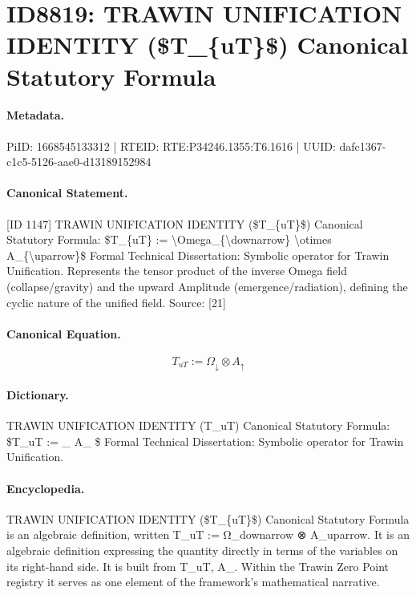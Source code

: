 \section*{ID8819: TRAWIN UNIFICATION IDENTITY (\$T\_\{uT\}\$) Canonical Statutory Formula}
\paragraph{Metadata.}
PiID: 1668545133312 | RTEID: RTE:P34246.1355:T6.1616 | UUID: dafc1367-c1c5-5126-aae0-d13189152984

\paragraph{Canonical Statement.}
[ID 1147] TRAWIN UNIFICATION IDENTITY (\$T\_\{uT\}\$) Canonical Statutory Formula: \$T\_\{uT\} := \textbackslash{}Omega\_\{\textbackslash{}downarrow\} \textbackslash{}otimes A\_\{\textbackslash{}uparrow\}\$ Formal Technical Dissertation: Symbolic operator for Trawin Unification. Represents the tensor product of the inverse Omega field (collapse/gravity) and the upward Amplitude (emergence/radiation), defining the cyclic nature of the unified field. Source: [21]

\paragraph{Canonical Equation.}
\[
T_{uT} := \Omega_{\downarrow} \otimes A_{\uparrow}
\]

\paragraph{Dictionary.}
TRAWIN UNIFICATION IDENTITY (T\_uT) Canonical Statutory Formula: \$T\_uT := \_ A\_ \$ Formal Technical Dissertation: Symbolic operator for Trawin Unification.

\paragraph{Encyclopedia.}
TRAWIN UNIFICATION IDENTITY (\$T\_\{uT\}\$) Canonical Statutory Formula is an algebraic definition, written T\_uT := Ω\_downarrow ⊗ A\_uparrow. It is an algebraic definition expressing the quantity directly in terms of the variables on its right-hand side. It is built from T\_uT, A\_. Within the Trawin Zero Point registry it serves as one element of the framework's mathematical narrative.
